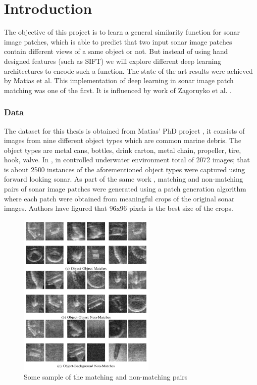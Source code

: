 \chapter{Introduction}
The objective of this project is to learn a general similarity function for sonar image patches, which is able to predict that two input sonar image patches contain different views of a same object or not. 
But instead of using hand designed features (such as SIFT) we will explore different deep learning architectures to encode such a function. The state of the art results were achieved by Matias et al. \cite{stateoftheart}
This implementation of deep learning in sonar image patch matching was one of the first. It is influenced by work of Zagoruyko et al. \cite{zagoruyko2015learning}.
\subsection{Data}
The dataset for this thesis is obtained from Matias' PhD project \cite{stateoftheart}, it consists of images from nine different object types which are common marine debris. 
The object types are metal cans, bottles, drink carton, metal chain, propeller, tire, hook, valve. In \cite{stateoftheart}, in controlled underwater environment total of 2072 images; 
that is about 2500 instances of the aforementioned object types were captured using forward looking sonar. As part of the same work \cite{stateoftheart}, matching and non-matching pairs 
of sonar image patches were generated using a patch generation algorithm where each patch were obtained from meaningful crops of the original sonar images. 
Authors have figured that 96x96 pixels is the best size of the crops.

\begin{figure}[ht]
\centering
\includegraphics[height= 8cm]{images/contrastive/generated_patches}%
\caption{Some sample of the matching and non-matching pairs }%
\label{fig:generated_patches}
\end{figure}

